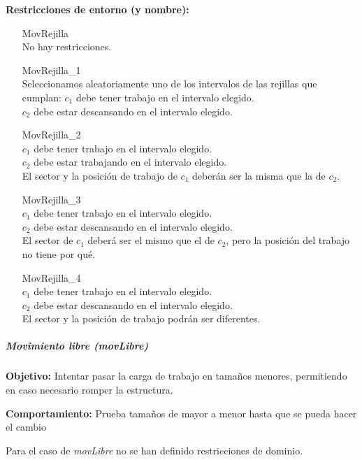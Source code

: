 \textbf{Restricciones de entorno (y nombre):}
\begin{enumerate}[align=parleft, labelsep=2cm, itemindent=5em, font=\itshape]
    \item[MovRejilla]\mbox{}\\No hay restricciones.

    \item[MovRejilla\_1]\mbox{}\\
    Seleccionamos aleatoriamente uno de los intervalos de las rejillas que cumplan:
    $c_1$ debe tener trabajo en el intervalo elegido. \\
    $c_2$ debe estar descansando en el intervalo elegido.

    \item[MovRejilla\_2]\mbox{}\\
    $c_1$ debe tener trabajo en el intervalo elegido. \\
    $c_2$ debe estar trabajando en el intervalo elegido. \\
    El sector y la posición de trabajo de $c_1$ deberán ser la misma que la de $c_2$.

    \item[MovRejilla\_3]\mbox{}\\
    $c_1$ debe tener trabajo en el intervalo elegido. \\
    $c_2$ debe estar descansando en el intervalo elegido. \\
    El sector de $c_1$ deberá ser el mismo que el de $c_2$, pero la posición del trabajo no tiene por qué.

    \item[MovRejilla\_4]\mbox{}\\
    $c_1$ debe tener trabajo en el intervalo elegido. \\
    $c_2$ debe estar descansando en el intervalo elegido. \\
    El sector y la posición de trabajo podrán ser diferentes.
\end{enumerate}

\subparagraph{Movimiento libre (\textit{movLibre})}
\label{entorno:movLibre}

\textbf{Objetivo:} Intentar pasar la carga de trabajo en tamaños menores, permitiendo en caso necesario romper la estructura.

\textbf{Comportamiento:} Prueba tamaños de mayor a menor hasta que se pueda hacer el cambio

Para el caso de \textit{movLibre} no se han definido restricciones de dominio.

